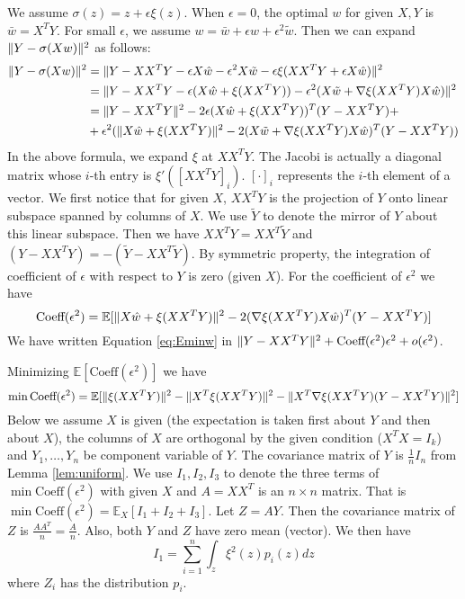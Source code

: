 \documentclass{article}
\DeclarePairedDelimiter\norm{\lVert}{\rVert}
\def\E{\mathbb{E}}
\begin{document}
We assume $\sigma(z) = z + \epsilon \xi(z)$. When $\epsilon = 0$, the optimal $w$ for given $X, Y$ is 
$\bar{w} = X^T Y $. For small $\epsilon$, we assume $ w = \bar{w} + \epsilon \hat{w} + \epsilon^2 \tilde{w}$. Then we can expand $\norm{Y - \sigma (X w ) }^2$ as follows:
\begin{align*}
\norm{Y - \sigma (X w ) }^2 & = \norm{Y - XX^T Y - \epsilon X \hat{w} - \epsilon^2 X \tilde{w} - \epsilon \xi(XX^T Y + \epsilon X\hat{w}) }^2 \\
& = \norm{ Y - XX^T Y - \epsilon (X\hat{w} + \xi(XX^T Y)) - \epsilon^2(X\tilde{w} + \nabla \xi(XX^TY)X\hat{w})}^2 \\
& = \norm{Y-XX^T Y }^2 - 2 \epsilon (X \hat{w} + \xi(XX^TY))^T (Y-XX^TY) +\\
& +\epsilon^2(\norm{X\hat{w} + \xi(XX^TY)}^2 - 2 (X \tilde{w}+ \nabla \xi(XX^TY)X\hat{w})^T(Y-XX^TY))
\end{align*}
In the above formula,  we expand $\xi$ at $XX^TY$. The Jacobi is actually a diagonal matrix whose $i$-th entry is $\xi'([XX^TY]_i)$. $[\cdot]_i$ represents the $i$-th element of a vector.
We first notice that for given $X$, $XX^TY$ is the projection of $Y$ onto linear subspace spanned by columns of $X$. We use $\tilde{Y}$ to denote the mirror of $Y$ about this linear subspace. Then we have
$XX^T Y = XX^T \tilde{Y}$ and $(Y- XX^TY) = -(\tilde{Y} - XX^T \tilde{Y})$. By symmetric property, the integration of coefficient of $\epsilon$ with respect to $Y$ is zero (given $X$). For the coefficient of $\epsilon^2$ we have
\begin{equation*}
\textrm{Coeff}(\epsilon^2)  =  \E[\norm{X\hat{w} + \xi(XX^TY)}^2 - 2 (\nabla \xi(XX^TY)X\hat{w})^T(Y-XX^TY)]
\end{equation*}
We have written Equation \eqref{eq:Eminw} in $ \norm{Y - X X^T Y}^2 + \textrm{Coeff}(\epsilon^2) \epsilon^2 + o(\epsilon^2)$.

Minimizing $\E[\textrm{Coeff}(\epsilon^2)]$ we have
\begin{equation}
\min \textrm{Coeff}(\epsilon^2) = \E[\norm{\xi(XX^TY)}^2 - \norm{X^T\xi(XX^TY)}^2 - \norm{X^T \nabla\xi(XX^TY)(Y-XX^TY)}^2]
\end{equation}
Below we assume $X$ is given (the expectation is taken first about $Y$ and then about $X$), the columns of $X$ are orthogonal by the given condition ($X^TX=I_k$) and $Y_1, \dots, Y_n $ be component variable of $Y$. The covariance matrix of $Y$ is $\frac{1}{n}I_n$ from Lemma \ref{lem:uniform}. We use $I_1, I_2, I_3$ to denote the three terms of $\min \textrm{Coeff}(\epsilon^2)$ with given $X$ and $A=XX^T$ is an $n\times n$ matrix. That is $ \min \textrm{Coeff}(\epsilon^2) = \E_{X} [I_1 + I_2 + I_3]$.
Let $Z = AY$. Then the covariance matrix of $Z$ is $\frac{AA^T}{n} = \frac{A}{n}$.
Also, both $Y$ and $Z$ have zero mean (vector). We then have
\begin{equation*}
I_1 = \sum_{i=1}^n \int_z \xi^2(z) p_i(z) dz
\end{equation*}
where $Z_i$ has the distribution $p_i$.
 
\end{document}

